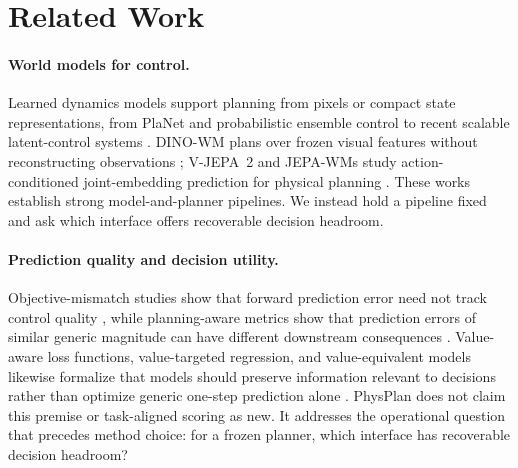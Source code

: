 \section{Related Work}
\label{sec:related}

\paragraph{World models for control.}
Learned dynamics models support planning from pixels or compact state representations, from PlaNet and probabilistic ensemble control to recent scalable latent-control systems \citep{hafner2019planet,chua2018pets,hansen2024tdmpc2}. DINO-WM plans over frozen visual features without reconstructing observations \citep{zhou2025dinowm}; V-JEPA~2 and JEPA-WMs study action-conditioned joint-embedding prediction for physical planning \citep{assran2025vjepa2,terver2026jepawms}. These works establish strong model-and-planner pipelines. We instead hold a pipeline fixed and ask which interface offers recoverable decision headroom.

\paragraph{Prediction quality and decision utility.}
Objective-mismatch studies show that forward prediction error need not track control quality \citep{lambert2020objective}, while planning-aware metrics show that prediction errors of similar generic magnitude can have different downstream consequences \citep{ivanovic2021planningaware}. Value-aware loss functions, value-targeted regression, and value-equivalent models likewise formalize that models should preserve information relevant to decisions rather than optimize generic one-step prediction alone \citep{farahmand2017valueaware,ayoub2020vtr,grimm2020valueequivalence,voelcker2025calibrated}. PhysPlan does not claim this premise or task-aligned scoring as new. It addresses the operational question that precedes method choice: for a frozen planner, which interface has recoverable decision headroom?

